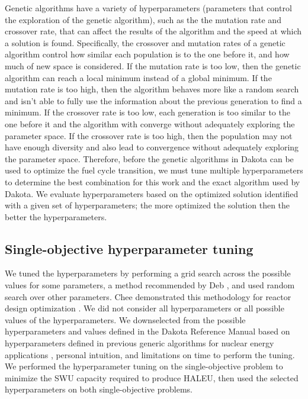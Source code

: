 Genetic algorithms have a variety of hyperparameters (parameters that 
control the exploration of the genetic algorithm), such as the the 
mutation rate and crossover rate, that can affect 
the results of the algorithm and the speed at which a solution is found. 
Specifically, the crossover and mutation rates of a genetic algorithm 
control how similar each population is to the one before it, and how much 
of new space is considered. If the mutation rate is too low, then the 
genetic algorithm can reach a local minimum instead of a global 
minimum. If the mutation rate is too high, then the algorithm behaves more 
like a random search and isn't able to fully use the information about the 
previous generation to find a minimum. If the crossover rate is too low, 
each generation is too similar to the one before it and the algorithm 
with converge without adequately exploring the parameter space. If the 
crossover rate is too high, then the population may not have enough 
diversity and also lead to convergence without adequately exploring the 
parameter space. 
Therefore, before the genetic algorithms in Dakota can be used to 
optimize the fuel cycle transition, we must tune multiple hyperparameters
to determine the best combination for this work and the exact algorithm 
used by Dakota. We evaluate hyperparameters based on the optimized solution 
identified with a given set of hyperparameters; the more optimized the 
solution then the better the hyperparameters. 

\subsection{Single-objective hyperparameter tuning}
We tuned the hyperparameters by performing a grid search across 
the possible values for some parameters, a method recommended 
by Deb \cite{deb_multi-objective_2001}, and used random 
search over other parameters. Chee demonstrated this methodology for 
reactor design optimization \cite{chee_fluoride-salt-cooled_2022}. 
We did not consider all hyperparameters or all possible values of the 
hyperparameters. We downselected from 
the possible hyperparameters and values defined in the Dakota Reference 
Manual \cite{adams_dakota_2021} based on hyperparameters defined in 
previous generic algorithms for nuclear energy applications
\cite{passerini_systematic_2014,chee_fluoride-salt-cooled_2022},
personal intuition, and limitations on time to perform 
the tuning. We performed the hyperparameter tuning on the single-objective 
problem to minimize the \gls{SWU} capacity required to produce 
\gls{HALEU}, then used the selected hyperparameters on both 
single-objective problems. 

